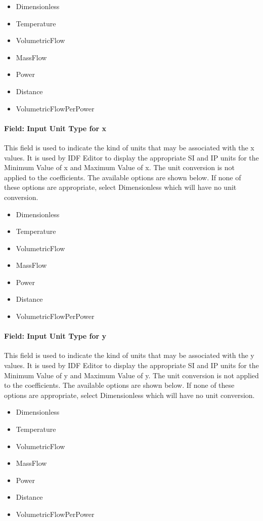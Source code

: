 \begin{itemize}
\item
  Dimensionless
\item
  Temperature
\item
  VolumetricFlow
\item
  MassFlow
\item
  Power
\item
  Distance
\item
  VolumetricFlowPerPower
\end{itemize}

\paragraph{Field: Input Unit Type for x}\label{field-input-unit-type-for-x-18}

This field is used to indicate the kind of units that may be associated with the x values. It is used by IDF Editor to display the appropriate SI and IP units for the Minimum Value of x and Maximum Value of x. The unit conversion is not applied to the coefficients. The available options are shown below. If none of these options are appropriate, select Dimensionless which will have no unit conversion.

\begin{itemize}
\item
  Dimensionless
\item
  Temperature
\item
  VolumetricFlow
\item
  MassFlow
\item
  Power
\item
  Distance
\item
  VolumetricFlowPerPower
\end{itemize}

\paragraph{Field: Input Unit Type for y}\label{field-input-unit-type-for-y-7}

This field is used to indicate the kind of units that may be associated with the y values. It is used by IDF Editor to display the appropriate SI and IP units for the Minimum Value of y and Maximum Value of y. The unit conversion is not applied to the coefficients. The available options are shown below. If none of these options are appropriate, select Dimensionless which will have no unit conversion.

\begin{itemize}
\item
  Dimensionless
\item
  Temperature
\item
  VolumetricFlow
\item
  MassFlow
\item
  Power
\item
  Distance
\item
  VolumetricFlowPerPower
\end{itemize}

